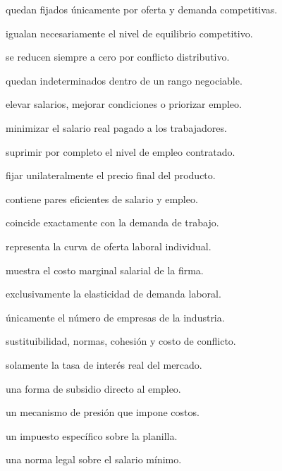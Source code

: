 \begin{opts}
    \item quedan fijados únicamente por oferta y demanda competitivas.
    \item igualan necesariamente el nivel de equilibrio competitivo.
    \item se reducen siempre a cero por conflicto distributivo.
    \item quedan indeterminados dentro de un rango negociable.
\end{opts}

\begin{opts}
    \item elevar salarios, mejorar condiciones o priorizar empleo.
    \item minimizar el salario real pagado a los trabajadores.
    \item suprimir por completo el nivel de empleo contratado.
    \item fijar unilateralmente el precio final del producto.
\end{opts}

\begin{opts}
    \item contiene pares eficientes de salario y empleo.
    \item coincide exactamente con la demanda de trabajo.
    \item representa la curva de oferta laboral individual.
    \item muestra el costo marginal salarial de la firma.
\end{opts}

\begin{opts}
    \item exclusivamente la elasticidad de demanda laboral.
    \item únicamente el número de empresas de la industria.
    \item sustituibilidad, normas, cohesión y costo de conflicto.
    \item solamente la tasa de interés real del mercado.
\end{opts}

\begin{opts}
    \item una forma de subsidio directo al empleo.
    \item un mecanismo de presión que impone costos.
    \item un impuesto específico sobre la planilla.
    \item una norma legal sobre el salario mínimo.
\end{opts}


